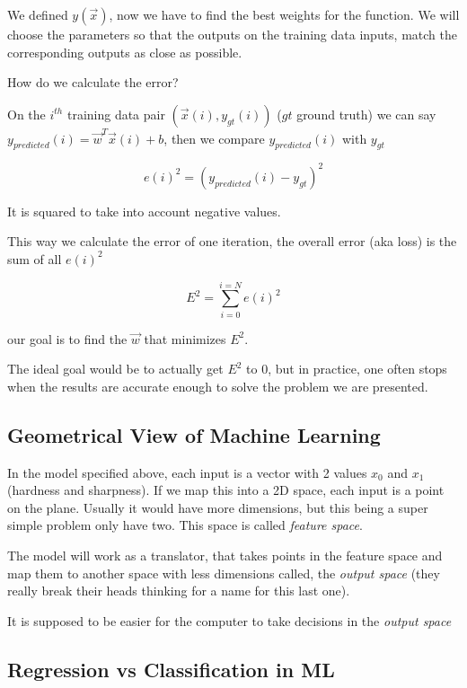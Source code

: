 \documentclass[twocolumn]{article}
\begin{document}
We defined $y(\vec{x})$, now we have to find the best weights for the function.
We will choose the parameters so that the outputs on the training data inputs,
match the corresponding outputs as close as possible.

How do we calculate the error?

On the $i^{th}$ training data pair $(\vec{x}(i), y_{gt}(i))$ ($gt$ ground
truth) we can say $y_{predicted}(i) = \vec{w}^{T}\vec{x}(i) + b$, then we
compare
$y_{predicted}(i)$ with $y_{gt}$

\begin{equation}
    e(i)^2 = (y_{predicted}(i) - y_{gt})^2
\end{equation}

It is squared to take into account negative values.

This way we calculate the error of one iteration, the overall error (aka loss)
is the sum of all $e(i)^2$

\begin{equation}
    E^2 = \sum_{i=0}^{i=N} e(i)^2
\end{equation}

our goal is to find the $\vec{w}$ that minimizes $E^2$.

The ideal goal would be to actually get $E^2$ to 0, but in practice, one often
stops when the results are accurate enough to solve the problem we are
presented.

\subsection{Geometrical View of Machine Learning}

In the model specified above, each input is a vector with 2 values $x_0$ and
$x_1$ (hardness and sharpness). If we map this into a 2D space, each input is a
point on the plane. Usually it would have more dimensions, but this being a
super simple problem only have two. This space is called \emph{feature space}.

The model will work as a translator, that takes points in the feature space and
map them to another space with less dimensions called, the \emph{output space}
(they really break their heads thinking for a name for this last one).

It is supposed to be easier for the computer to take decisions in the
\emph{output space}

\subsection{Regression vs Classification in ML}
\end{document}
